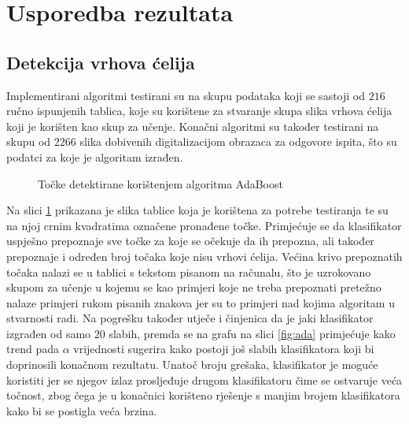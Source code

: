 \documentclass[times, utf8, zavrsni, numeric]{fer}
\begin{document}
\section{Usporedba rezultata}

\subsection{Detekcija vrhova ćelija}
Implementirani algoritmi testirani su na skupu podataka koji se sastoji od $216$ ručno ispunjenih tablica, koje su korištene za stvaranje skupa slika vrhova ćelija koji je korišten kao skup za učenje.
Konačni algoritmi su također testirani na skupu od $2266$ slika dobivenih digitalizacijom obrazaca za odgovore ispita, što su podatci za koje je algoritam izrađen.\\
\begin{figure}[!ht]
    \centering
    \captionsetup{justification=centering}
    \caption{Točke detektirane korištenjem algoritma AdaBoost}
    \label{fig:adaResult}
\end{figure}

Na slici \ref{fig:adaResult} prikazana je slika tablice koja je korištena za potrebe testiranja te su na njoj crnim kvadratima označene pronađene točke.
Primjećuje se da klasifikator uspješno prepoznaje sve točke za koje se očekuje da ih prepozna, ali također prepoznaje i određen broj točaka koje nisu vrhovi ćelija.
Većina krivo prepoznatih točaka nalazi se u tablici s tekstom pisanom na računalu, što je uzrokovano skupom za učenje u kojemu se kao primjeri koje ne treba prepoznati pretežno nalaze primjeri rukom pisanih znakova jer su to primjeri nad kojima algoritam u stvarnosti radi.
Na pogrešku također utječe i činjenica da je jaki klasifikator izgrađen od samo $20$ slabih, premda se na grafu na slici \ref{fig:ada} primjećuje kako trend pada $\alpha$ vrijednosti sugerira kako postoji još slabih klasifikatora koji bi doprinosili konačnom rezultatu.
Unatoč broju grešaka, klasifikator je moguće koristiti jer se njegov izlaz prosljeđuje drugom klasifikatoru čime se ostvaruje veća točnost, zbog čega je u konačnici korišteno rješenje s manjim brojem klasifikatora kako bi se postigla veća brzina.\\
\end{document}
